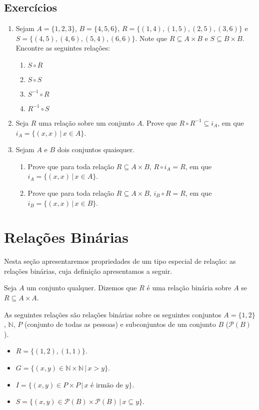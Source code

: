 \subsection{Exercícios}

\begin{enumerate}
	\item Sejam $A=\{1,2,3\}$, $B=\{4,5,6\}$, $R=\{(1,4), (1,5), (2,5), (3,6)\}$ e $S=\{(4,5), (4,6), (5,4), (6,6)\}$.
	      Note que $R\subseteq A\times B$ e $S\subseteq B\times B$. Encontre as seguintes rela\c{c}\~oes:
	\begin{enumerate}
		\item $S\circ R$
		\item $S\circ S$
		\item $S^{-1}\circ R$
		\item $R^{-1}\circ S$
	\end{enumerate}
	\item Seja $R$ uma rela\c{c}\~ao sobre um conjunto $A$. Prove que
          $R\circ R^{-1}\subseteq i_{A}$, em que $i_{A}=\{(x,x)\,|\,x\in A\}$.
	\item Sejam $A$ e $B$ dois conjuntos quaisquer.
	\begin{enumerate}
		\item Prove que para toda rela\c{c}\~ao $R\subseteq A\times B$, $R\circ i_{A} = R$, em que $i_{A}=\{(x,x)\,|\,x\in A\}$.
		\item Prove que para toda rela\c{c}\~ao $R\subseteq A\times B$, $i_{B}\circ R = R$, em que $i_{B}=\{(x,x)\,|\,x\in B\}$.
	\end{enumerate}
\end{enumerate}

\section{Relações Binárias}

Nesta seção apresentaremos propriedades de um tipo especial de
relação: as relações binárias, cuja definição apresentamos a seguir.

\begin{Definition}
Seja $A$ um conjunto qualquer. Dizemos que $R$ é uma relação binária
sobre $A$ se $R \subseteq A\times A$.
\end{Definition}

\begin{Example}
As seguintes relações são relações binárias sobre os seguintes
conjuntos $A = \{1,2\}$, $\mathbb{N}$, $P$ (conjunto de todas as
pessoas) e subconjuntos de um conjunto $B$ ($\mathcal{P}(B)$).
\begin{itemize}
  \item $R = \{(1,2),(1,1)\}$.
  \item $G = \{(x,y)\in \mathbb{N}\times\mathbb{N}\,|\,x > y\}$.
  \item $I =\{(x,y)\in P \times P\,|\,x\text{ é irmão de }y\}$.
  \item $S = \{(x,y)\in \mathcal{P}(B)\times\mathcal{P}(B)\,|\,x
    \subseteq y\}$.
\end{itemize}
\end{Example}

